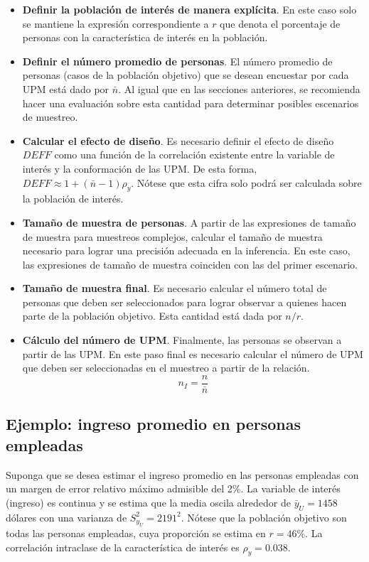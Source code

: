 \documentclass[
  12pt,
]{book}
\begin{document}
\begin{itemize}
\item
  \textbf{Definir la población de interés de manera explícita}. En este caso solo se mantiene la expresión correspondiente a \(r\) que denota el porcentaje de personas con la característica de interés en la población.
\item
  \textbf{Definir el número promedio de personas}. El número promedio de personas (casos de la población objetivo) que se desean encuestar por cada UPM está dado por \(\bar{n}\). Al igual que en las secciones anteriores, se recomienda hacer una evaluación sobre esta cantidad para determinar posibles escenarios de muestreo.
\item
  \textbf{Calcular el efecto de diseño}. Es necesario definir el efecto de diseño \(DEFF\) como una función de la correlación existente entre la variable de interés y la conformación de las UPM. De esta forma, \(DEFF \approx 1 + (\bar{n} - 1)\rho_y\). Nótese que esta cifra solo podrá ser calculada sobre la población de interés.
\item
  \textbf{Tamaño de muestra de personas}. A partir de las expresiones de tamaño de muestra para muestreos complejos, calcular el tamaño de muestra necesario para lograr una precisión adecuada en la inferencia. En este caso, las expresiones de tamaño de muestra coinciden con las del primer escenario.
\item
  \textbf{Tamaño de muestra final}. Es necesario calcular el número total de personas que deben ser seleccionados para lograr observar a quienes hacen parte de la población objetivo. Esta cantidad está dada por \(n / r\).
\item
  \textbf{Cálculo del número de UPM}. Finalmente, las personas se observan a partir de las UPM. En este paso final es necesario calcular el número de UPM que deben ser seleccionadas en el muestreo a partir de la relación.
  \[
  n_{I} = \frac{n}{\bar{n}} 
  \]
\end{itemize}

\hypertarget{ejemplo-ingreso-promedio-en-personas-empleadas}{%
\subsection{Ejemplo: ingreso promedio en personas empleadas}\label{ejemplo-ingreso-promedio-en-personas-empleadas}}

Suponga que se desea estimar el ingreso promedio en las personas empleadas con un margen de error relativo máximo admisible del 2\%. La variable de interés (ingreso) es continua y se estima que la media oscila alrededor de \(\bar{y}_U=1458\) dólares con una varianza de \(S^2_{y_U}=2191^2\). Nótese que la población objetivo son todas las personas empleadas, cuya proporción se estima en \(r = 46\)\%. La correlación intraclase de la característica de interés es \(\rho_y = 0.038\).
\end{document}
